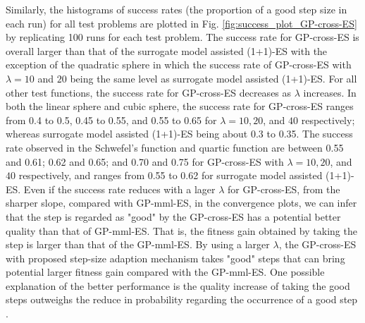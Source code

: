 Similarly, the histograms of success rates (the proportion of a good step size in each run) for all test problems are plotted in Fig. \ref{fig:success_plot_GP-cross-ES} by replicating 100 runs for each test problem. The success rate for GP-cross-ES is overall larger than that of the surrogate model assisted (1+1)-ES with the exception of the quadratic sphere in which the success rate of GP-cross-ES with $\lambda=10$ and $20$ being the same level as surrogate model assisted (1+1)-ES. For all other test functions, the success rate for GP-cross-ES decreases as $\lambda$ increases. In both the linear sphere and cubic sphere, the success rate for GP-cross-ES ranges from 0.4 to 0.5, 0.45 to 0.55, and 0.55 to 0.65 for $\lambda=10,20$, and $40$ respectively; whereas surrogate model assisted (1+1)-ES being about 0.3 to 0.35. The success rate observed in the Schwefel's function and quartic function are between 0.55 and 0.61; 0.62 and 0.65; and 0.70 and 0.75 for GP-cross-ES with $\lambda=10,20$, and $40$ respectively, and ranges from 0.55 to 0.62 for surrogate model assisted (1+1)-ES. Even if the success rate reduces with a lager $\lambda$ for GP-cross-ES, from the sharper slope, compared with GP-mml-ES, in the convergence plots, we can infer that the step is regarded as "good" by the GP-cross-ES has a potential better quality than that of GP-mml-ES. That is, the fitness gain obtained by taking the step is larger than that of the GP-mml-ES. By using a larger $\lambda$, the GP-cross-ES with proposed step-size adaption mechanism takes "good" steps that can bring potential larger fitness gain compared with the GP-mml-ES. One possible explanation of the better performance is the quality increase of taking the good steps outweighs the reduce in probability regarding the occurrence of a good step .  





